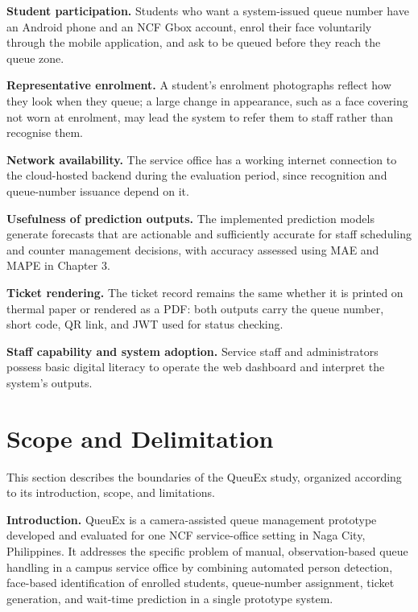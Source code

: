 \documentclass{research}
\newcommand{\sysname}{QueuEx}
\begin{document}
\textbf{Student participation.} Students who want a system-issued queue
number have an Android phone and an NCF Gbox account, enrol their face
voluntarily through the mobile application, and ask to be queued before
they reach the queue zone.

\textbf{Representative enrolment.} A student's enrolment photographs
reflect how they look when they queue; a large change in appearance, such
as a face covering not worn at enrolment, may lead the system to refer
them to staff rather than recognise them.

\textbf{Network availability.} The service office has a working internet
connection to the cloud-hosted backend during the evaluation period,
since recognition and queue-number issuance depend on it.

\textbf{Usefulness of prediction outputs.} The implemented prediction
models generate forecasts that are actionable and sufficiently accurate
for staff scheduling and counter management decisions, with accuracy
assessed using MAE and MAPE in Chapter 3.

\textbf{Ticket rendering.} The ticket record remains the same whether
it is printed on thermal paper or rendered as a PDF: both outputs carry
the queue number, short code, QR link, and JWT used for status
checking.

\textbf{Staff capability and system adoption.} Service staff and
administrators possess basic digital literacy to operate the web
dashboard and interpret the system's outputs.

\section{Scope and Delimitation}
\label{sec:scope}

This section describes the boundaries of the \sysname{} study, organized
according to its introduction, scope, and limitations.

\textbf{Introduction.} \sysname{} is a camera-assisted queue management
prototype developed and evaluated for one NCF service-office setting in
Naga City, Philippines. It addresses the specific problem of manual,
observation-based queue handling in a campus service office by combining
automated person detection, face-based identification of enrolled
students, queue-number assignment, ticket generation, and wait-time
prediction in a single prototype system.
\end{document}
